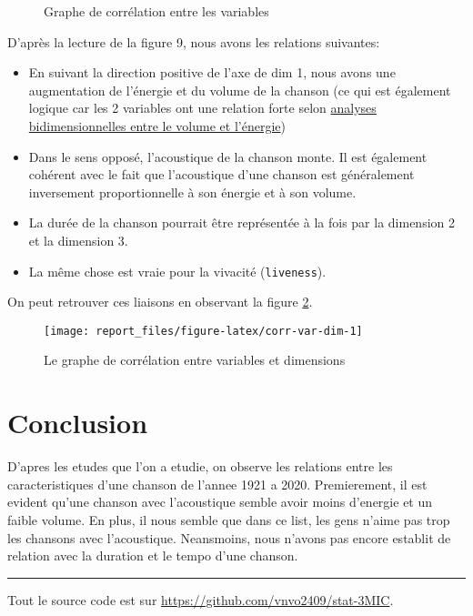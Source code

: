 \documentclass[
  11pt,
  xcolor = usenames,dvipsnames]{article}
\newcommand{\passthrough}[1]{#1}
\providecommand{\tightlist}{%
  \setlength{\itemsep}{0pt}\setlength{\parskip}{0pt}}
\begin{document}
\begin{figure}

{\centering {}

}

\caption{Graphe de corrélation entre les variables}\label{fig:corvar-acp-12}
\end{figure}

D'après la lecture de la figure 9, nous avons les relations suivantes:

\begin{itemize}
\tightlist
\item
  En suivant la direction positive de l'axe de dim 1, nous avons une augmentation de l'énergie et du volume de la chanson (ce qui est également logique car les 2 variables ont une relation forte selon \protect\hyperlink{volume-energy}{analyses bidimensionnelles entre le volume et l'énergie})
\item
  Dans le sens opposé, l'acoustique de la chanson monte. Il est également cohérent avec le fait que l'acoustique d'une chanson est généralement inversement proportionnelle à son énergie et à son volume.
\item
  La durée de la chanson pourrait être représentée à la fois par la dimension 2 et la dimension 3.
\item
  La même chose est vraie pour la vivacité (\passthrough{\lstinline!liveness!}).
\end{itemize}

On peut retrouver ces liaisons en observant la figure \ref{fig:corr-var-dim}.

\begin{figure}

{\centering \texttt{[image: report\_files/figure-latex/corr-var-dim-1]} 

}

\caption{Le graphe de corrélation entre variables et dimensions}\label{fig:corr-var-dim}
\end{figure}

\hypertarget{conclusion}{%
\section{Conclusion}\label{conclusion}}

D'apres les etudes que l'on a etudie, on observe les relations entre les caracteristiques d'une chanson de l'annee 1921 a 2020.
Premierement, il est evident qu'une chanson avec l'acoustique semble avoir moins d'energie et un faible volume.
En plus, il nous semble que dans ce list, les gens n'aime pas trop les chansons avec l'acoustique.
Neansmoins, nous n'avons pas encore establit de relation avec la duration et le tempo d'une chanson.

\begin{center}\rule{0.5\linewidth}{0.5pt}\end{center}

Tout le source code est sur \url{https://github.com/vnvo2409/stat-3MIC}.
\end{document}
